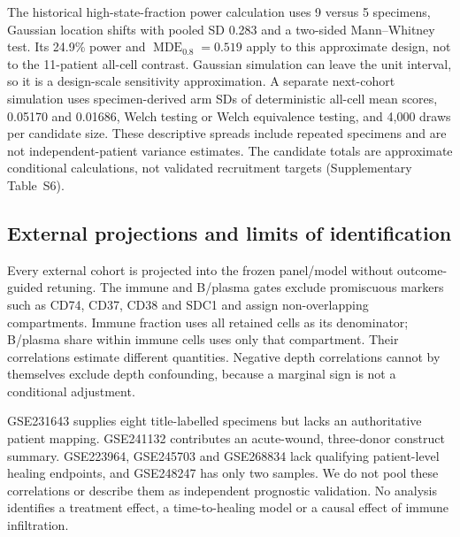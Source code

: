 \documentclass[10pt,a4paper]{article}
\begin{document}
The historical high-state-fraction power calculation uses 9 versus 5 specimens, Gaussian location shifts with pooled SD 0.283 and a two-sided Mann--Whitney test. Its 24.9\% power and $\operatorname{MDE}_{0.8}=0.519$ apply to this approximate design, not to the 11-patient all-cell contrast. Gaussian simulation can leave the unit interval, so it is a design-scale sensitivity approximation. A separate next-cohort simulation uses specimen-derived arm SDs of deterministic all-cell mean scores, 0.05170 and 0.01686, Welch testing or Welch equivalence testing, and 4,000 draws per candidate size. These descriptive spreads include repeated specimens and are not independent-patient variance estimates. The candidate totals are approximate conditional calculations, not validated recruitment targets (Supplementary Table~S6).

\subsection{External projections and limits of identification}
Every external cohort is projected into the frozen panel/model without outcome-guided retuning. The immune and B/plasma gates exclude promiscuous markers such as CD74, CD37, CD38 and SDC1 and assign non-overlapping compartments. Immune fraction uses all retained cells as its denominator; B/plasma share within immune cells uses only that compartment. Their correlations estimate different quantities. Negative depth correlations cannot by themselves exclude depth confounding, because a marginal sign is not a conditional adjustment.

GSE231643 supplies eight title-labelled specimens but lacks an authoritative patient mapping. GSE241132 contributes an acute-wound, three-donor construct summary. GSE223964, GSE245703 and GSE268834 lack qualifying patient-level healing endpoints, and GSE248247 has only two samples. We do not pool these correlations or describe them as independent prognostic validation. No analysis identifies a treatment effect, a time-to-healing model or a causal effect of immune infiltration.
\end{document}
